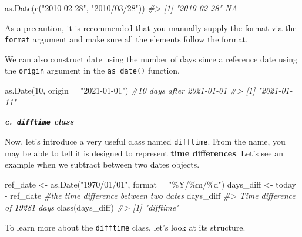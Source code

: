 \documentclass[
]{book}
\newenvironment{Shaded}{\begin{snugshade}}{\end{snugshade}}
\newcommand{\AttributeTok}[1]{\textcolor[rgb]{0.77,0.63,0.00}{#1}}
\newcommand{\CommentTok}[1]{\textcolor[rgb]{0.56,0.35,0.01}{\textit{#1}}}
\newcommand{\DecValTok}[1]{\textcolor[rgb]{0.00,0.00,0.81}{#1}}
\newcommand{\FunctionTok}[1]{\textcolor[rgb]{0.00,0.00,0.00}{#1}}
\newcommand{\NormalTok}[1]{#1}
\newcommand{\OtherTok}[1]{\textcolor[rgb]{0.56,0.35,0.01}{#1}}
\newcommand{\SpecialCharTok}[1]{\textcolor[rgb]{0.00,0.00,0.00}{#1}}
\newcommand{\StringTok}[1]{\textcolor[rgb]{0.31,0.60,0.02}{#1}}
\begin{document}
\begin{Shaded}
\begin{Highlighting}[]
\FunctionTok{as.Date}\NormalTok{(}\FunctionTok{c}\NormalTok{(}\StringTok{"2010{-}02{-}28"}\NormalTok{, }\StringTok{"2010/03/28"}\NormalTok{))}
\CommentTok{\#\textgreater{} [1] "2010{-}02{-}28" NA}
\end{Highlighting}
\end{Shaded}

As a precaution, it is recommended that you manually supply the format via the \texttt{format} argument and make sure all the elements follow the format.

We can also construct date using the number of days since a reference date using the \texttt{origin} argument in the \texttt{as\_date()} function.

\begin{Shaded}
\begin{Highlighting}[]
\FunctionTok{as.Date}\NormalTok{(}\DecValTok{10}\NormalTok{, }\AttributeTok{origin =} \StringTok{"2021{-}01{-}01"}\NormalTok{)      }\CommentTok{\#10 days after 2021{-}01{-}01}
\CommentTok{\#\textgreater{} [1] "2021{-}01{-}11"}
\end{Highlighting}
\end{Shaded}

\textbf{\emph{c.~\texttt{difftime} class}}

Now, let's introduce a very useful class named \texttt{difftime}. From the name, you may be able to tell it is designed to represent \textbf{time differences}. Let's see an example when we subtract between two dates objects.

\begin{Shaded}
\begin{Highlighting}[]
\NormalTok{ref\_date }\OtherTok{\textless{}{-}} \FunctionTok{as.Date}\NormalTok{(}\StringTok{"1970/01/01"}\NormalTok{, }\AttributeTok{format =} \StringTok{"\%Y/\%m/\%d"}\NormalTok{)}
\NormalTok{days\_diff }\OtherTok{\textless{}{-}}\NormalTok{ today }\SpecialCharTok{{-}}\NormalTok{ ref\_date           }\CommentTok{\#the time difference between two dates}
\NormalTok{days\_diff}
\CommentTok{\#\textgreater{} Time difference of 19281 days}
\FunctionTok{class}\NormalTok{(days\_diff)}
\CommentTok{\#\textgreater{} [1] "difftime"}
\end{Highlighting}
\end{Shaded}

To learn more about the \texttt{difftime} class, let's look at its structure.
\end{document}
